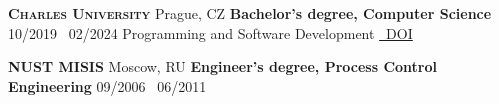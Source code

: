 
\vspace{1.0em}

\textsc{\textbf{Charles University}} \textsuperscript{\href{https://www.mff.cuni.cz/}{\faExternalLink*}}
\hfill Prague, CZ \newline
\textbf{Bachelor's degree, Computer Science}
\hfill 10/2019 \textendash\ 02/2024 \newline
Programming and Software Development
\hfill \href{http://hdl.handle.net/20.500.11956/188286}{\faFilePdf[regular]~DOI}

\vspace{1.0em}

\textsc{\textbf{NUST MISIS}} \textsuperscript{\href{https://www.misis.ru/}{\faExternalLink*}}
\hfill Moscow, RU \newline
\textbf{Engineer's degree, Process Control Engineering}
\hfill 09/2006 \textendash\ 06/2011

\vspace{1.0em}
